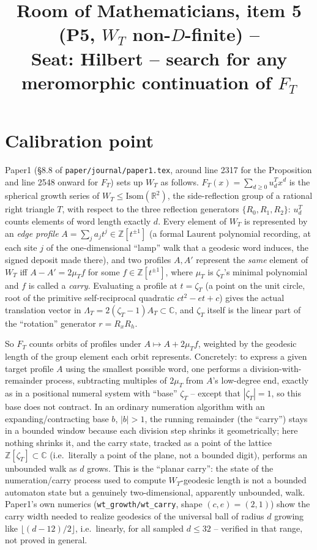 \documentclass[11pt]{article}
\title{Room of Mathematicians, item 5 (P5, $W_T$ non-$D$-finite) --\\
Seat: Hilbert -- search for any meromorphic continuation of $F_T$}
\author{}
\date{}
\begin{document}
\maketitle

\section*{Calibration point}

Paper1 (\S8.8 of \texttt{paper/journal/paper1.tex}, around line 2317
for the Proposition and line 2548 onward for $F_T$) sets up $W_T$ as follows.
$F_T(x)=\sum_{d\ge0}u_d^Tx^d$ is the spherical growth series of $W_T\le
\mathrm{Isom}(\mathbb R^2)$, the side-reflection group of a rational right
triangle $T$, with respect to the three reflection generators
$\{R_0,R_1,R_2\}$: $u_d^T$ counts elements of word length exactly $d$.
Every element of $W_T$ is represented by an \emph{edge profile}
$A=\sum_j a_jt^j\in\mathbb Z[t^{\pm1}]$ (a formal Laurent polynomial recording,
at each site $j$ of the one-dimensional ``lamp'' walk that a geodesic word
induces, the signed deposit made there), and two profiles $A,A'$ represent the
\emph{same} element of $W_T$ iff $A-A'=2\mu_Tf$ for some $f\in\mathbb
Z[t^{\pm1}]$, where $\mu_T$ is $\zeta_T$'s minimal polynomial and $f$ is called
a \emph{carry}. Evaluating a profile at $t=\zeta_T$ (a point on the unit
circle, root of the primitive self-reciprocal quadratic $ct^2-et+c$) gives the
actual translation vector in $\Lambda_T=2(\zeta_T-1)A_T\subset\mathbb C$, and
$\zeta_T$ itself is the linear part of the ``rotation'' generator $r=R_xR_h$.

So $F_T$ counts orbits of profiles under $A\mapsto A+2\mu_Tf$, weighted by the
geodesic length of the group element each orbit represents. Concretely: to
express a given target profile $A$ using the smallest possible word, one
performs a division-with-remainder process, subtracting multiples of
$2\mu_T$ from $A$'s low-degree end, exactly as in a positional numeral system
with ``base'' $\zeta_T$ -- except that $|\zeta_T|=1$, so this base does not
contract. In an ordinary numeration algorithm with an expanding/contracting
base $b$, $|b|>1$, the running remainder (the ``carry'') stays in a bounded
window because each division step shrinks it geometrically; here nothing
shrinks it, and the carry state, tracked as a point of the lattice
$\mathbb Z[\zeta_T]\subset\mathbb C$ (i.e.\ literally a point of the plane,
not a bounded digit), performs an unbounded walk as $d$ grows. This is the
``planar carry'': the state of the numeration/carry process used to compute
$W_T$-geodesic length is not a bounded automaton state but a genuinely
two-dimensional, apparently unbounded, walk. Paper1's own numerics
(\texttt{wt\_growth/wt\_carry}, shape $(c,e)=(2,1)$) show the carry width
needed to realize geodesics of the universal ball of radius $d$ growing like
$\lfloor(d-12)/2\rfloor$, i.e.\ linearly, for all sampled $d\le32$ -- verified
in that range, not proved in general.
\end{document}
